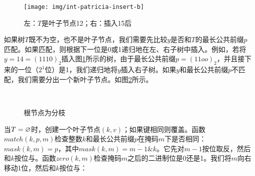 \documentclass[b5paper]{ctexart}
\begin{document}
\begin{figure}[htbp]
  \centering
  \texttt{[image: img/int-patricia-insert-b]}
  \caption{左：$T$是叶子节点12；右：插入15后}
  \label{fig:int-patricia-insert-b}
\end{figure}

如果树$T$既不为空，也不是叶子节点，我们需要先比较$y$是否和$T$的最长公共前缀$p$匹配。如果匹配，则根据下一位是0或1递归地在左、右子树中插入。例如，若将$y = 14 = (1110)_2$插入图\ref{fig:int-patricia-insert-b}所示的树，由于最长公共前缀$p = (11oo)_2$，并且接下来的一位（$2^1$位）是1，我们递归地将$y$插入右子树。如果$y$和最长公共前缀$p$不匹配，我们需要分出一个新叶子节点。如图\ref{fig:int-patricia-insert-c}所示。

\begin{figure}[htbp]
  \centering
  \\
  \caption{根节点为分枝}
  \label{fig:int-patricia-insert-c}
\end{figure}

\be
{}
\ee

当$T = \varnothing$时，创建一个叶子节点$(k, v)$；如果键相同则覆盖。函数$match(k, p, m)$检查整数$k$和最长公共前缀$p$在掩码$m$下是否相同：$mask(k, m) = p$，其中$mask(k, m) = \overline{m-1} \& k$。它先对$m - 1$按位取反，然后和$k$按位与。函数$zero(k, m)$检查掩码$m$之后的二进制位是0还是1。我们将$m$向右移动1位，然后和$k$按位与：
\end{document}
